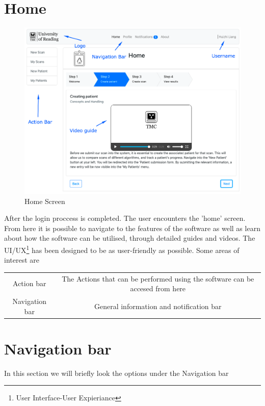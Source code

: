 	\section{Home}
		\begin{figure}[H]
			\iftrue
			\centering
			\caption{Home Screen}
			\includegraphics[scale=0.3]{figures/home}
			\fi
		\end{figure}
		After the login proccess is completed. The user encounters the 'home' screen. From here it is possible to navigate to the features of the software
		as well as learn about how the software can be utilised, through detailed guides and videos. The UI/UX\footnote{User Interface-User Expieriance} 
		has been designed to be as user-friendly as possible. Some areas of interest are
		\begin{center}
			\begin{tabular}{ |c|c| } 
				\hline
				Action bar & The Actions that can be performed using the software can be accesed from here\\
				Navigation bar & General information and notification bar \\
				\hline
			\end{tabular}
		\end{center}
	\section{Navigation bar}
		In this section we will briefly look the options under the Navigation bar
